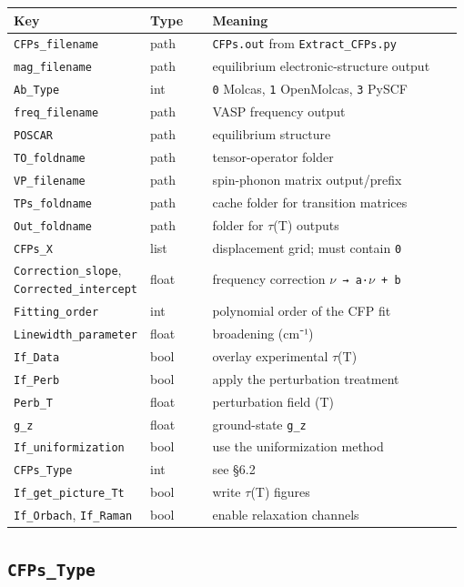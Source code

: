 \documentclass[11pt,a4paper]{article}
\providecommand{\texorpdfstring}[2]{#1}
\begin{document}
\begin{longtable}[]{@{}>{\raggedright\arraybackslash}p{0.26\linewidth} >{\raggedright\arraybackslash}p{0.14\linewidth} >{\raggedright\arraybackslash}p{0.58\linewidth}@{}}
\toprule
Key\strut
 & Type\strut
 & Meaning\strut
\tabularnewline
\midrule
\endhead
\texttt{CFPs\_filename}\strut
 & path\strut
 & \texttt{CFPs.out} from \texttt{Extract\_CFPs.py}\strut
\tabularnewline
\texttt{mag\_filename}\strut
 & path\strut
 & equilibrium electronic-structure output\strut
\tabularnewline
\texttt{Ab\_Type}\strut
 & int\strut
 & \texttt{0} Molcas, \texttt{1} OpenMolcas, \texttt{3} PySCF\strut
\tabularnewline
\texttt{freq\_filename}\strut
 & path\strut
 & VASP frequency output\strut
\tabularnewline
\texttt{POSCAR}\strut
 & path\strut
 & equilibrium structure\strut
\tabularnewline
\texttt{TO\_foldname}\strut
 & path\strut
 & tensor-operator folder\strut
\tabularnewline
\texttt{VP\_filename}\strut
 & path\strut
 & spin-phonon matrix output/prefix\strut
\tabularnewline
\texttt{TPs\_foldname}\strut
 & path\strut
 & cache folder for transition matrices\strut
\tabularnewline
\texttt{Out\_foldname}\strut
 & path\strut
 & folder for \(\tau\)(T) outputs\strut
\tabularnewline
\texttt{CFPs\_X}\strut
 & list\strut
 & displacement grid; must contain \texttt{0}\strut
\tabularnewline
\texttt{Correction\_slope}, \texttt{Corrected\_intercept}\strut
 & float\strut
 & frequency correction \texttt{\(\nu\)\ →\ a·\(\nu\)\ +\ b}\strut
\tabularnewline
\texttt{Fitting\_order}\strut
 & int\strut
 & polynomial order of the CFP fit\strut
\tabularnewline
\texttt{Linewidth\_parameter}\strut
 & float\strut
 & broadening (cm⁻¹)\strut
\tabularnewline
\texttt{If\_Data}\strut
 & bool\strut
 & overlay experimental \(\tau\)(T)\strut
\tabularnewline
\texttt{If\_Perb}\strut
 & bool\strut
 & apply the perturbation treatment\strut
\tabularnewline
\texttt{Perb\_T}\strut
 & float\strut
 & perturbation field (T)\strut
\tabularnewline
\texttt{g\_z}\strut
 & float\strut
 & ground-state \texttt{g\_z}\strut
\tabularnewline
\texttt{If\_uniformization}\strut
 & bool\strut
 & use the uniformization method\strut
\tabularnewline
\texttt{CFPs\_Type}\strut
 & int\strut
 & see \S6.2\strut
\tabularnewline
\texttt{If\_get\_picture\_Tt}\strut
 & bool\strut
 & write \(\tau\)(T) figures\strut
\tabularnewline
\texttt{If\_Orbach}, \texttt{If\_Raman}\strut
 & bool\strut
 & enable relaxation channels\strut
\tabularnewline
\bottomrule
\end{longtable}

\subsection{\texorpdfstring{\texttt{CFPs\_Type}}{6.2 CFPs\_Type}}\label{cfps_type}
\end{document}
